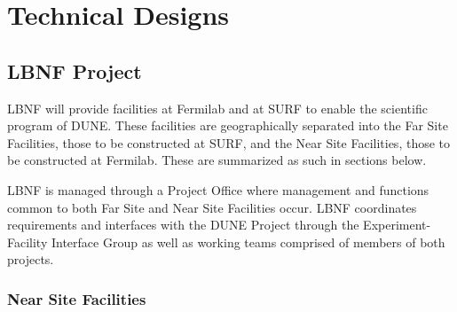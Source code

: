 
\chapter{Technical Designs}
\label{v1ch:tech-designs}

%
%
%
%
%
%
%
%


\section{LBNF Project}

LBNF will provide facilities at Fermilab and at SURF to enable the scientific program of DUNE. These facilities are geographically separated into the Far Site Facilities, those to be constructed at SURF, and the Near Site Facilities, those to be constructed at Fermilab. These are summarized as such in sections below. 

LBNF is managed through a Project Office where management and functions common to both Far Site and Near Site Facilities occur. LBNF coordinates requirements and interfaces with the DUNE Project through the Experiment-Facility Interface Group as well as working teams comprised of members of both projects. 

\subsection{Near Site Facilities}


